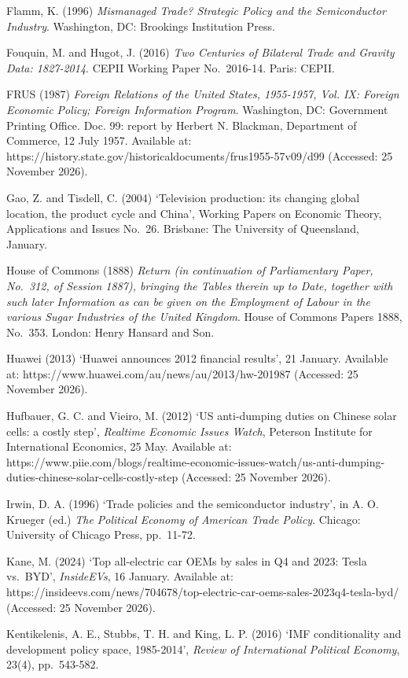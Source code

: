 Flamm, K. (1996) \emph{Mismanaged Trade? Strategic Policy and the
Semiconductor Industry}. Washington, DC: Brookings Institution Press.

Fouquin, M. and Hugot, J. (2016) \emph{Two Centuries of Bilateral Trade
and Gravity Data: 1827-2014}. CEPII Working Paper No.~2016-14. Paris:
CEPII.

FRUS (1987) \emph{Foreign Relations of the United States, 1955-1957,
Vol. IX: Foreign Economic Policy; Foreign Information Program}.
Washington, DC: Government Printing Office. Doc. 99: report by Herbert
N. Blackman, Department of Commerce, 12 July 1957. Available at:
https://history.state.gov/historicaldocuments/frus1955-57v09/d99
(Accessed: 25 November 2026).

Gao, Z. and Tisdell, C. (2004) `Television production: its changing
global location, the product cycle and China', Working Papers on
Economic Theory, Applications and Issues No.~26. Brisbane: The
University of Queensland, January.

House of Commons (1888) \emph{Return (in continuation of Parliamentary
Paper, No.~312, of Session 1887), bringing the Tables therein up to
Date, together with such later Information as can be given on the
Employment of Labour in the various Sugar Industries of the United
Kingdom}. House of Commons Papers 1888, No.~353. London: Henry Hansard
and Son.

Huawei (2013) `Huawei announces 2012 financial results', 21 January.
Available at: https://www.huawei.com/au/news/au/2013/hw-201987
(Accessed: 25 November 2026).

Hufbauer, G. C. and Vieiro, M. (2012) `US anti-dumping duties on Chinese
solar cells: a costly step', \emph{Realtime Economic Issues Watch},
Peterson Institute for International Economics, 25 May. Available at:
https://www.piie.com/blogs/realtime-economic-issues-watch/us-anti-dumping-duties-chinese-solar-cells-costly-step
(Accessed: 25 November 2026).

Irwin, D. A. (1996) `Trade policies and the semiconductor industry', in
A. O. Krueger (ed.) \emph{The Political Economy of American Trade
Policy}. Chicago: University of Chicago Press, pp.~11-72.

Kane, M. (2024) `Top all-electric car OEMs by sales in Q4 and 2023:
Tesla vs.~BYD', \emph{InsideEVs}, 16 January. Available at:
https://insideevs.com/news/704678/top-electric-car-oems-sales-2023q4-tesla-byd/
(Accessed: 25 November 2026).

Kentikelenis, A. E., Stubbs, T. H. and King, L. P. (2016) `IMF
conditionality and development policy space, 1985-2014', \emph{Review of
International Political Economy}, 23(4), pp.~543-582.

